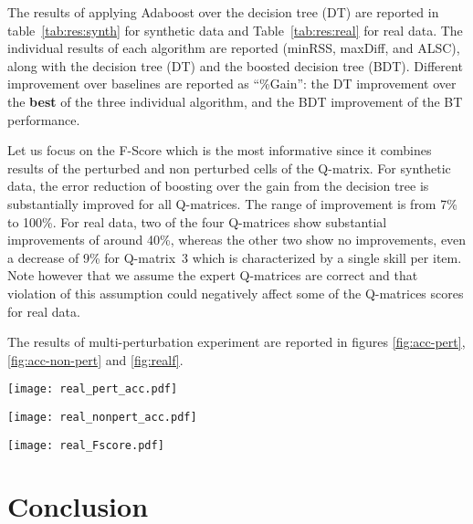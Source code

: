 \documentclass{edm_template}
\begin{document}
The results of applying Adaboost over the decision tree (DT) are reported in table~\ref{tab:res:synth} for synthetic data and Table~\ref{tab:res:real} for real data. The individual results of each algorithm are reported (minRSS, maxDiff, and ALSC), along with the decision tree (DT) and the boosted decision tree (BDT).  Different improvement over baselines are reported as ``\%Gain'': the DT improvement over the \textbf{best} of the three individual algorithm, and the BDT improvement of the BT performance.

Let us focus on the F-Score which is the most informative since it combines results of the perturbed and non perturbed cells of the Q-matrix.  For synthetic data, the error reduction of boosting over the gain from the decision tree is substantially improved for all Q-matrices. The range of improvement is from 7\% to 100\%.  For real data, two of the four Q-matrices show substantial improvements of around 40\%, whereas the other two show no improvements, even a decrease of 9\% for Q-matrix~3 which is characterized by a single skill per item.  Note however that we assume the expert Q-matrices are correct and that violation of this assumption could negatively affect some of the Q-matrices scores for real data.

The results of multi-perturbation experiment are reported in figures \ref{fig:acc-pert}, \ref{fig:acc-non-pert} and \ref{fig:realf}. 

\begin{figure*}
  \centering
    \texttt{[image: real\_pert\_acc.pdf]}
  \caption{Logit accuracy for perturbated cells.}\label{fig:acc-pert}
\end{figure*}

\begin{figure*}
  \centering
    \texttt{[image: real\_nonpert\_acc.pdf]}
  \caption{Logit accuracy for non-perturbated cells of real data.}\label{fig:acc-non-pert}
\end{figure*}

\begin{figure*}
  \caption{Logit F1-score for real data.}
  \centering
    \texttt{[image: real\_Fscore.pdf]}\label{fig:realf}
\end{figure*}


\section{Conclusion}
\end{document}
